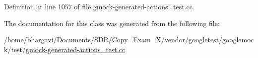 Definition at line 1057 of file gmock-\/generated-\/actions\+\_\+test.\+cc.



The documentation for this class was generated from the following file\+:\begin{DoxyCompactItemize}
\item 
/home/bhargavi/\+Documents/\+S\+D\+R/\+Copy\+\_\+\+Exam\+\_\+X/vendor/googletest/googlemock/test/\hyperlink{gmock-generated-actions__test_8cc}{gmock-\/generated-\/actions\+\_\+test.\+cc}\end{DoxyCompactItemize}

